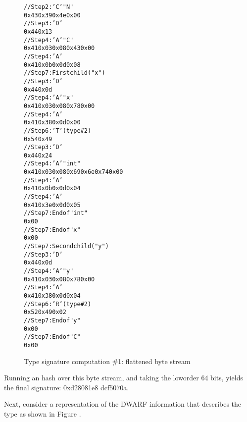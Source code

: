 \begin{figure}
\begin{dwflisting}
\begin{alltt}
// Step 2: 'C' \DWTAGnamespace "N"
0x43 0x39 0x4e 0x00
// Step 3: 'D' \DWTAGstructuretype
0x44 0x13
// Step 4: 'A' \DWATname \DWFORMstring "C"
0x41 0x03 0x08 0x43 0x00
// Step 4: 'A' \DWATbytesize {}
0x41 0x0b 0x0d 0x08
// Step 7: First child ("x")
    // Step 3: 'D' \DWTAGmember
    0x44 0x0d
    // Step 4: 'A' \DWATname \DWFORMstring "x"
    0x41 0x03 0x08 0x78 0x00
    // Step 4: 'A' \DWATdatamemberlocation {}
    0x41 0x38 0x0d 0x00
    // Step 6: 'T' \DWATtype (type \#2)
    0x54 0x49
        // Step 3: 'D' \DWTAGbasetype
        0x44 0x24
        // Step 4: 'A' \DWATname \DWFORMstring "int"
        0x41 0x03 0x08 0x69 0x6e 0x74 0x00
        // Step 4: 'A' \DWATbytesize {}
        0x41 0x0b 0x0d 0x04
        // Step 4: 'A' \DWATencoding \DWFORMsdata \DWATEsigned
        0x41 0x3e 0x0d 0x05
        // Step 7: End of \DWTAGbasetype "int"
        0x00
    // Step 7: End of \DWTAGmember "x"
    0x00
// Step 7: Second child ("y")
    // Step 3: 'D' \DWTAGmember
    0x44 0x0d
    // Step 4: 'A' \DWATname \DWFORMstring "y"
    0x41 0x03 0x08 0x78 0x00
    // Step 4: 'A' \DWATdatamemberlocation {}
    0x41 0x38 0x0d 0x04
    // Step 6: 'R' \DWATtype (type \#2)
    0x52 0x49 0x02
    // Step 7: End of \DWTAGmember "y"
    0x00
// Step 7: End of \DWTAGstructuretype "C"
0x00
\end{alltt}
\end{dwflisting}
\caption{Type signature computation \#1: flattened byte stream}
\label{fig:typesignaturecomputation1flattenedbytestream}
\end{figure}

Running an \MDfive{} hash over this byte stream, and taking the
low\dash order 64 bits, yields the final signature: 
0xd28081e8 dcf5070a.

Next, consider a representation of the DWARF information that
describes the type  as shown in 
Figure .

